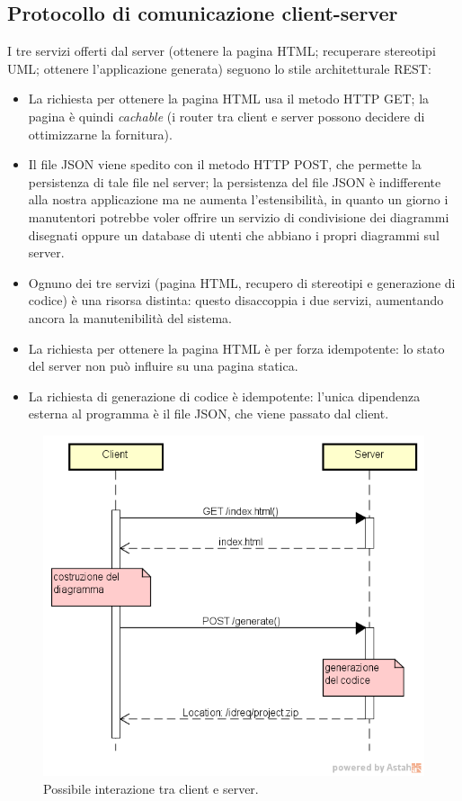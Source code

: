 \subsection{Protocollo di comunicazione client-server} \label{sec:arch_proto}
I tre servizi offerti dal server (ottenere la pagina HTML; recuperare stereotipi UML; ottenere l'applicazione generata) seguono lo stile architetturale REST:
\begin{itemize}
	\item La richiesta per ottenere la pagina HTML usa il metodo HTTP GET; la pagina è quindi \emph{cachable} (i router tra client e server possono decidere di ottimizzarne la fornitura).
	\item Il file JSON viene spedito con il metodo HTTP POST, che permette la persistenza di tale file nel server; la persistenza del file JSON è indifferente alla nostra applicazione ma ne aumenta l'estensibilità, in quanto un giorno i manutentori potrebbe voler offrire un servizio di condivisione dei diagrammi disegnati oppure un database di utenti che abbiano i propri diagrammi sul server.
	\item Ognuno dei tre servizi (pagina HTML, recupero di stereotipi e generazione di codice) è una risorsa distinta: questo disaccoppia i due servizi, aumentando ancora la manutenibilità del sistema.
	\item La richiesta per ottenere la pagina HTML è per forza idempotente: lo stato del server non può influire su una pagina statica. %
	\item La richiesta di generazione di codice è idempotente: l'unica dipendenza esterna al programma è il file JSON, che viene passato dal client.
\end{itemize}

\begin{figure} \label{fig:protocol}
	\includegraphics[scale=0.66]{img/http}
	\caption{Possibile interazione tra client e server.}
\end{figure}


